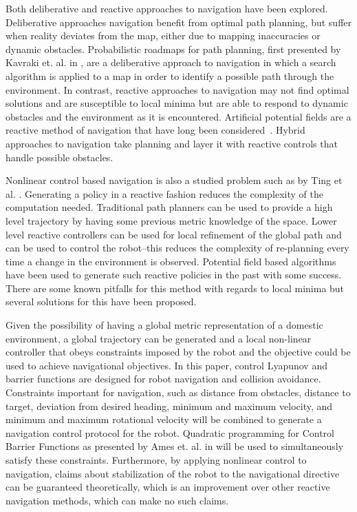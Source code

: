 \documentclass[journal]{IEEEtran}
\begin{document}
Both deliberative and reactive approaches to navigation have been explored. Deliberative approaches navigation benefit from optimal path planning, but suffer when reality deviates from the map, either due to mapping inaccuracies or dynamic obstacles. Probabilistic roadmaps for path planning, first presented by Kavraki et. al. in \cite{kavraki1996}, are a deliberative approach to navigation in which a search algorithm is applied to a map in order to identify a possible path through the environment. In contrast, reactive approaches to navigation may not find optimal solutions and are susceptible to local minima but are able to respond to dynamic obstacles and the environment as it is encountered. Artificial potential fields are a reactive method of navigation that have long been considered~\cite{khatib1985}. Hybrid approaches to navigation take planning and layer it with reactive controls that handle possible obstacles.

Nonlinear control based navigation is also a studied problem such as by Ting et al. \cite{ting2014reactive}. Generating a policy in a reactive fashion reduces the complexity of the computation needed. Traditional path planners can be used to provide a high level trajectory by having some previous metric knowledge of the space. Lower level reactive controllers can be used for local refinement of the global path and can be used to control the robot--this reduces the complexity of re-planning every time a change in the environment is observed. Potential field based algorithms have been used to generate such reactive policies in the past with some success. There are some known pitfalls for this method with regards to local minima but several solutions for this have been proposed.

Given the possibility of having a global metric representation of a domestic environment, a global trajectory can be generated and a local non-linear controller that obeys constraints imposed by the robot and the objective could be used to achieve navigational objectives. In this paper, control Lyapunov and barrier functions are designed for robot navigation and collision avoidance. Constraints important for navigation, such as distance from obstacles, distance to target, deviation from desired heading, minimum and maximum velocity, and minimum and maximum rotational velocity will be combined to generate a navigation control protocol for the robot. Quadratic programming for Control Barrier Functions as presented by Ames et. al. in \cite{amesACC} will be used to simultaneously satisfy these constraints. Furthermore, by applying nonlinear control to navigation, claims about stabilization of the robot to the navigational directive can be guaranteed theoretically, which is an improvement over other reactive navigation methods, which can make no such claims.
\end{document}

